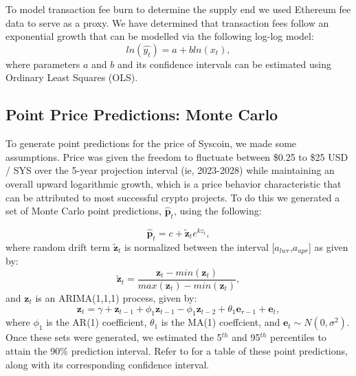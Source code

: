 \documentclass[journal,twocolumn,12pt]{ieeesyscoin}
\begin{document}
To model transaction fee burn to determine the supply end we used Ethereum fee data to serve as a proxy. We have determined that transaction fees follow an exponential growth that can be modelled via the following log-log model:
\begin{equation}
ln(\hat{y_{t}}) = a + bln(x_{t}),
\end{equation}
where parameters $a$ and $b$ and its confidence intervals can be estimated using Ordinary Least Squares (OLS).

\subsection{Point Price Predictions: Monte Carlo}
\label{appendix:monte_carlo}
To generate point predictions for the price of Syscoin, we made some assumptions. Price was given the freedom to fluctuate between \$0.25 to \$25 USD / SYS over the 5-year projection interval (ie, 2023-2028) while maintaining an overall upward logarithmic growth, which is a price behavior characteristic that can be attributed to most successful crypto projects. To do this we generated a set of Monte Carlo point predictions, $\mathbf{\hat{p}}_{t}$, using the following:

\begin{equation}
\label{eqn:trend}
	\mathbf{\hat{p}}_{t} = c + \mathbf{\tilde{z}}_{t}e^{k z_{t}},
\end{equation}
where random drift term $\mathbf{\tilde{z}}_{t}$ is normalized between the interval [$a_{lwr}$,$a_{upr}$] as given by:
\begin{equation}
\label{eqn:min_max}
	\mathbf{\tilde{z}}_{t}= \frac{\mathbf{z}_{t} - min(\mathbf{z}_{t})}{max(\mathbf{z}_{t}) - min(\mathbf{z}_{t})},
\end{equation}
and $\mathbf{z}_{t}$ is an ARIMA(1,1,1) process, given by:
\begin{equation}
\label{eqn:drift}
	\mathbf{z}_{t} = \gamma + \mathbf{z}_{t-1} + \phi_{1} \mathbf{z}_{t-1} - \phi_{1} \mathbf{z}_{t-2} +  \theta_{1} \mathbf{e}_{r-1} + \mathbf{e}_{t},
\end{equation}
where $\phi_{1}$ is the AR(1) coefficient, $\theta_{1}$ is the MA(1) coeffcient, and $\mathbf{e}_{t} \sim N(0, \sigma^2)$. Once these sets were generated, we estimated the 5$^{th}$ and 95$^{th}$ percentiles to attain the 90\% prediction interval. Refer to \cite{Moo22A} for a table of these point predictions, along with its corresponding confidence interval. 
\end{document}
